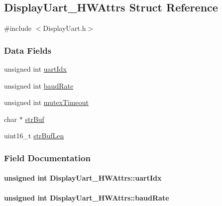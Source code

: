 \subsection{Display\+Uart\+\_\+\+H\+W\+Attrs Struct Reference}
\label{struct_display_uart___h_w_attrs}


{\ttfamily \#include $<$Display\+Uart.\+h$>$}

\subsubsection*{Data Fields}
\begin{DoxyCompactItemize}
\item 
unsigned int \hyperlink{struct_display_uart___h_w_attrs_a3c111ee8c6a5c628ab9aa3f58bb24b13}{uart\+Idx}
\item 
unsigned int \hyperlink{struct_display_uart___h_w_attrs_a808a00c56f02105b6a8254c861f770f4}{baud\+Rate}
\item 
unsigned int \hyperlink{struct_display_uart___h_w_attrs_a088c26aa2cb1345d33d016617c1db852}{mutex\+Timeout}
\item 
char $\ast$ \hyperlink{struct_display_uart___h_w_attrs_a50486e4fcebccea63bf5233176fa8512}{str\+Buf}
\item 
uint16\+\_\+t \hyperlink{struct_display_uart___h_w_attrs_a3a5db18ba55168690f3064f98d7ceaac}{str\+Buf\+Len}
\end{DoxyCompactItemize}


\subsubsection{Field Documentation}
\paragraph[{uart\+Idx}]{\setlength{\rightskip}{0pt plus 5cm}unsigned int Display\+Uart\+\_\+\+H\+W\+Attrs\+::uart\+Idx}\label{struct_display_uart___h_w_attrs_a3c111ee8c6a5c628ab9aa3f58bb24b13}
\paragraph[{baud\+Rate}]{\setlength{\rightskip}{0pt plus 5cm}unsigned int Display\+Uart\+\_\+\+H\+W\+Attrs\+::baud\+Rate}\label{struct_display_uart___h_w_attrs_a808a00c56f02105b6a8254c861f770f4}
